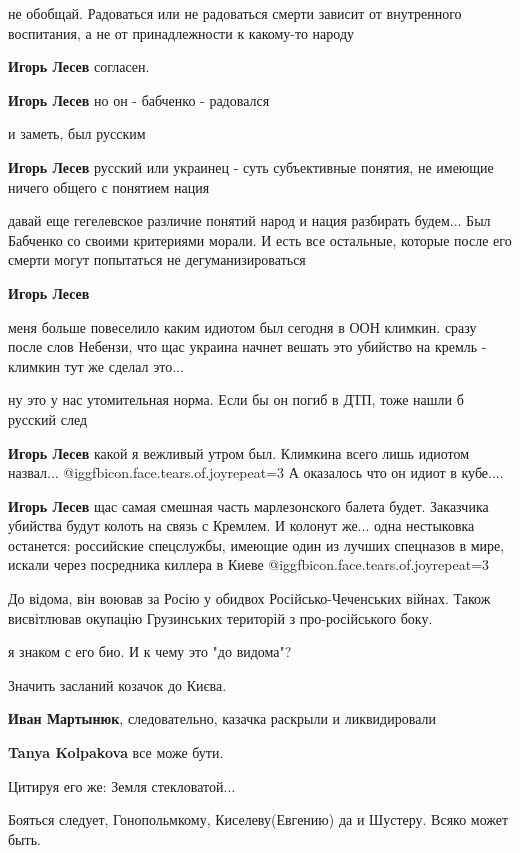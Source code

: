 \begin{itemize}
\begin{itemize} %
не обобщай. Радоваться или не радоваться смерти зависит от внутренного воспитания, а не от принадлежности к какому-то народу

\textbf{Игорь Лесев} согласен.

\textbf{Игорь Лесев} но он - бабченко - радовался

и заметь, был русским

\textbf{Игорь Лесев} русский или украинец - суть субъективные понятия, не имеющие ничего общего с понятием нация


давай еще гегелевское различие понятий народ и нация разбирать будем... Был
Бабченко со своими критериями морали. И есть все остальные, которые после его
смерти могут попытаться не дегуманизироваться


\textbf{Игорь Лесев} 

меня больше повеселило каким идиотом был сегодня в ООН климкин. сразу после
слов Небензи, что щас украина начнет вешать это убийство на кремль - климкин
тут же сделал это...


ну это у нас утомительная норма. Если бы он погиб в ДТП, тоже нашли б русский след

\textbf{Игорь Лесев} какой я вежливый утром был. Климкина всего лишь идиотом назвал... @igg{fbicon.face.tears.of.joy}{repeat=3} А оказалось что он идиот в кубе....

\textbf{Игорь Лесев} щас самая смешная часть марлезонского балета будет. Заказчика убийства будут колоть на связь с Кремлем. И колонут же... одна нестыковка останется: российские спецслужбы, имеющие один из лучших спецназов в мире, искали через посредника киллера в Киеве @igg{fbicon.face.tears.of.joy}{repeat=3} 
\end{itemize} %


До відома, він воював за Росію у обидвох Російсько-Чеченських війнах. Також
висвітлював окупацію Грузинських територій з про-російського боку.

\begin{itemize} %
я знаком с его био. И к чему это "до видома"?

Значить засланий козачок до Києва.

\textbf{Иван Мартынюк}, следовательно, казачка раскрыли и ликвидировали

\textbf{Tanya Kolpakova} все може бути.
\end{itemize} %

Цитируя его же: Земля стекловатой...

Бояться следует, Гонопольмкому, Киселеву(Евгению) да и Шустеру. Всяко может быть.

\end{itemize} %
